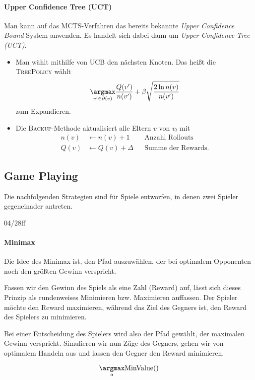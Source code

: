 \documentclass[ngerman]{../LaTeX-Templates/Paper/paper}
\begin{document}
\paragraph{Upper Confidence Tree (UCT)}
Man kann auf das MCTS-Verfahren das bereits bekannte {\itshape Upper Confidence Bound}-System anwenden. Es handelt sich dabei dann um {\itshape Upper Confidence Tree (UCT)}.
\begin{itemize}
	\item Man wählt mithilfe von UCB den nächsten Knoten. Das heißt die \textsc{TreePolicy} wählt
	\begin{equation*}
		\underset{v'\in\partial(v)}\argmax\frac{Q(v')}{n(v')}+\beta\sqrt{\frac{2\ln n(v)}{n(v')}}
	\end{equation*}
	zum Expandieren.
	\item Die \textsc{Backup}-Methode aktualisiert alle Eltern $v$ von $v_l$ mit
	\begin{align*}
		n(v)&\leftarrow n(v)+1&&\text{Anzahl Rollouts}\\
		Q(v)&\leftarrow Q(v)+\Delta&&\text{Summe der Rewards.}
	\end{align*}
\end{itemize}


\subsection{Game Playing}
Die nachfolgenden Strategien sind für Spiele entworfen, in denen zwei Spieler gegeneinader antreten.


04/28ff
\paragraph{Minimax}
Die Idee des Minimax ist, den Pfad auszuwählen, der bei optimalem Opponenten noch den größten Gewinn verspricht.

Fassen wir den Gewinn des Spiels als eine Zahl (Reward) auf, lässt sich dieses Prinzip als rundenweises Minimieren bzw. Maximieren auffassen.
Der Spieler möchte den Reward maximieren, während das Ziel des Gegners ist, den Reward des Spielers zu minimieren. 

Bei einer Entscheidung des Spielers wird also der Pfad gewählt, der maximalen Gewinn verspricht. Simulieren wir nun Züge des Gegners, gehen wir von optimalem Handeln aus und lassen den Gegner den Reward minimieren. 

\begin{equation*}
	\underset a\argmax \mathrm{MinValue}()
\end{equation*}
\end{document}
